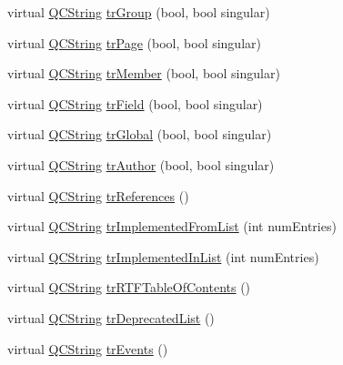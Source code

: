 \begin{DoxyCompactItemize}
\item 
virtual \mbox{\hyperlink{class_q_c_string}{Q\+C\+String}} \mbox{\hyperlink{class_translator_arabic_a0e846c5779242ca184c0eba9e939be4c}{tr\+Group}} (bool, bool singular)
\item 
virtual \mbox{\hyperlink{class_q_c_string}{Q\+C\+String}} \mbox{\hyperlink{class_translator_arabic_a01335b7b68d621778e021feffe7ad1cc}{tr\+Page}} (bool, bool singular)
\item 
virtual \mbox{\hyperlink{class_q_c_string}{Q\+C\+String}} \mbox{\hyperlink{class_translator_arabic_a079b9fecf2ac416addd85d6498290628}{tr\+Member}} (bool, bool singular)
\item 
virtual \mbox{\hyperlink{class_q_c_string}{Q\+C\+String}} \mbox{\hyperlink{class_translator_arabic_a50484f8c4f445796aa3e473c7c90a5df}{tr\+Field}} (bool, bool singular)
\item 
virtual \mbox{\hyperlink{class_q_c_string}{Q\+C\+String}} \mbox{\hyperlink{class_translator_arabic_a27d1fb78bcb37b60d150951b6b434ef1}{tr\+Global}} (bool, bool singular)
\item 
virtual \mbox{\hyperlink{class_q_c_string}{Q\+C\+String}} \mbox{\hyperlink{class_translator_arabic_a0250e808ef38fa180eba0595f89210ee}{tr\+Author}} (bool, bool singular)
\item 
virtual \mbox{\hyperlink{class_q_c_string}{Q\+C\+String}} \mbox{\hyperlink{class_translator_arabic_a71262664c2f41bd6ea6ce7d38e017fb4}{tr\+References}} ()
\item 
virtual \mbox{\hyperlink{class_q_c_string}{Q\+C\+String}} \mbox{\hyperlink{class_translator_arabic_ac98762581291eb3f4d940af089e38d91}{tr\+Implemented\+From\+List}} (int num\+Entries)
\item 
virtual \mbox{\hyperlink{class_q_c_string}{Q\+C\+String}} \mbox{\hyperlink{class_translator_arabic_a38d315ad4f381c2049d2607aaba3a829}{tr\+Implemented\+In\+List}} (int num\+Entries)
\item 
virtual \mbox{\hyperlink{class_q_c_string}{Q\+C\+String}} \mbox{\hyperlink{class_translator_arabic_a16112f2d3d309019839aa56d43e265fe}{tr\+R\+T\+F\+Table\+Of\+Contents}} ()
\item 
virtual \mbox{\hyperlink{class_q_c_string}{Q\+C\+String}} \mbox{\hyperlink{class_translator_arabic_a6364c3efba8cdc7bd7518b779c605ec8}{tr\+Deprecated\+List}} ()
\item 
virtual \mbox{\hyperlink{class_q_c_string}{Q\+C\+String}} \mbox{\hyperlink{class_translator_arabic_a22a39d424d0cb37428a7350d04e4448b}{tr\+Events}} ()
\item 

\end{DoxyCompactItemize}
